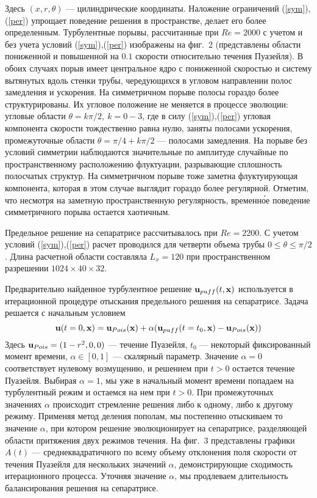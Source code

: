 Здесь $(x,r,\theta)$ --- цилиндрические координаты. Наложение ограничений (\ref{sym}),(\ref{per}) упрощает поведение решения в пространстве, делает его более определенным. Турбулентные порывы, рассчитанные при $Re=2000$ с учетом и без учета условий (\ref{sym}),(\ref{per}) изображены на фиг.~2 (представлены области пониженной и повышенной на $0.1$ скорости относительно течения Пуазейля). В обоих случаях порыв имеет центральное ядро с пониженной скоростью и систему вытянутых вдоль стенки трубы, чередующихся в угловом направлении полос замедления и ускорения. На симметричном порыве полосы гораздо более структурированы. Их угловое положение не меняется в процессе эволюции: угловые области $\theta=k\pi/2,\ k=0-3$, где в силу (\ref{sym}),(\ref{per}) угловая компонента скорости тождественно равна нулю, заняты полосами ускорения, промежуточные области $\theta=\pi/4+k\pi/2$ --- полосами замедления. На порыве без условий симметрии наблюдаются значительные по амплитуде случайные по пространственному расположению флуктуации, разрывающие сплошность полосчатых структур. На симметричном порыве тоже заметна флуктуирующая компонента, которая в этом случае выглядит гораздо более регулярной. Отметим, что несмотря на заметную пространственную регулярность, временн\'{о}е поведение симметричного порыва остается хаотичным.

Предельное решение на сепаратрисе рассчитывалось при $Re=2200$. С учетом условий (\ref{sym}),(\ref{per}) расчет проводился для четверти объема трубы $0\leqslant\theta\leqslant\pi/2$. Длина расчетной области составляла $L_x=120$ при пространственном разрешении $1024\times40\times32$.

Предварительно найденное турбулентное решение $\mathbf{u}_{puff}(t,\mathbf{x})$ используется в итерационной процедуре отыскания предельного решения на сепаратрисе. Задача решается с начальным условием
\begin{equation*}
  \mathbf{u}(t=0,\mathbf{x})=\mathbf{u}_{Pois}(\mathbf{x})+\alpha(\mathbf{u}_{puff}(t=t_0,\mathbf{x})-\mathbf{u}_{Pois}(\mathbf{x}))
 \label{init}
\end{equation*}
Здесь $\mathbf{u}_{Pois}=(1-r^2,0,0)$ --- течение Пуазейля, $t_0$ --- некоторый фиксированный момент времени, $\alpha\in[0,1]$ --- скалярный параметр. Значение $\alpha=0$ соответствует нулевому возмущению, и решением при $t>0$ остается течение Пуазейля. Выбирая $\alpha=1$, мы уже в начальный момент времени попадаем на турбулентный режим и остаемся на нем при $t>0$. При промежуточных значениях $\alpha$ происходит стремление решения либо к одному, либо к другому режиму. Применяя метод деления пополам, мы постепенно отыскиваем то значение $\alpha$, при котором решение эволюционирует на сепаратрисе, разделяющей области притяжения двух режимов течения. На фиг.~3 представлены графики $A(t)$ --- среднеквадратичного по всему объему отклонения поля скорости от течения Пуазейля для нескольких значений $\alpha$, демонстрирующие сходимость итерационного процесса. Уточняя значение $\alpha$, мы продлеваем длительность балансирования решения на сепаратрисе.

